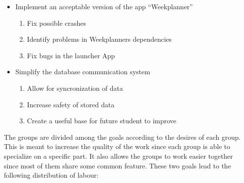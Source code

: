 \begin{itemize}
  \item Implement an acceptable version of the app ``Weekplanner''
  	\begin{enumerate}
  		\item Fix possible crashes
  		\item Identify problems in Weekplanners dependencies
  		\item Fix bugs in the launcher App
	\end{enumerate}
  \item Simplify the database communication system
   	\begin{enumerate}
  		\item Allow for syncronization of data
  		\item Increase safety of stored data
  		\item Create a useful base for future student to improve
	\end{enumerate}
\end{itemize}


The groups are divided among the goals according to the desires of each group.
This is meant to increase the quality of the work since each group is able to
specialize on a specific part. It also allows the groups to work easier together
since most of them share some common feature. These two goals lead to the
following distribution of labour:

